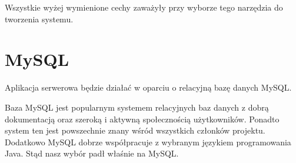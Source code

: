 \par{Wszystkie wyżej wymienione cechy zaważyły przy wyborze tego narzędzia do tworzenia systemu.}

\section[MySQL]{MySQL}

\par{Aplikacja serwerowa będzie działać w oparciu o relacyjną bazę danych MySQL.} 

\par{Baza MySQL jest popularnym systemem relacyjnych baz danych z dobrą dokumentacją oraz szeroką i aktywną społecznością użytkowników. Ponadto system ten jest powszechnie znany wśród wszystkich członków projektu. Dodatkowo MySQL dobrze współpracuje z wybranym językiem programowania Java. Stąd nasz wybór padł właśnie na MySQL.}

